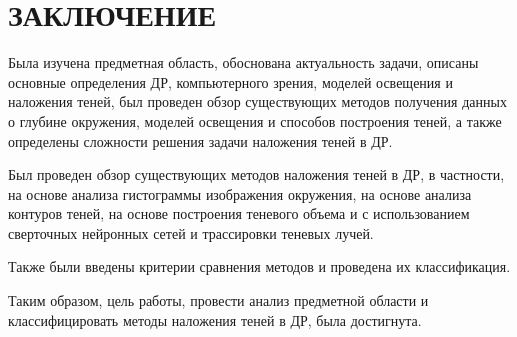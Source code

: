 \chapter*{ЗАКЛЮЧЕНИЕ}

Была изучена предметная область, обоснована актуальность задачи, описаны основные определения ДР, компьютерного зрения, моделей освещения и наложения теней, был проведен обзор существующих методов получения данных о глубине окружения, моделей освещения и способов построения теней, а также определены сложности решения задачи наложения теней в ДР.

Был проведен обзор существующих методов наложения теней в ДР, в частности, на основе анализа гистограммы изображения окружения, на основе анализа контуров теней, на основе построения теневого объема и с использованием сверточных нейронных сетей и трассировки теневых лучей.

Также были введены критерии сравнения методов и проведена их классификация.

Таким образом, цель работы, провести анализ предметной области и классифицировать методы наложения теней в ДР, была достигнута.
